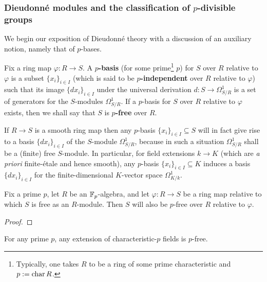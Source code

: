         \subsubsection{Dieudonn\'e modules and the classification of \texorpdfstring{$p$}{}-divisible groups}
            We begin our exposition of Dieudonn\'e theory with a discussion of an auxiliary notion, namely that of $p$-bases.
            \begin{definition}[$p$-bases] \label{def: p_bases}
                Fix a ring map $\varphi: R \to S$. A \textbf{$p$-basis} (for some prime\footnote{Typically, one takes $R$ to be a ring of some prime characteristic and $p := \operatorname{char} R$.} $p$) for $S$ over $R$ relative to $\varphi$ is a subset $\{x_i\}_{i \in I}$ (which is said to be \textbf{$p$-independent} over $R$ relative to $\varphi$) such that its image $\{dx_i\}_{i \in I}$ under the universal derivation $d: S \to \Omega^1_{S/R}$ is a set of generators for the $S$-modules $\Omega^1_{S/R}$. If a $p$-basis for $S$ over $R$ relative to $\varphi$ exists, then we shall say that $S$ is \textbf{$p$-free} over $R$.
            \end{definition}
            \begin{remark}
                If $R \to S$ is a smooth ring map then any $p$-basis $\{x_i\}_{i \in I} \subseteq S$ will in fact give rise to a basis $\{dx_i\}_{i \in I}$ of the $S$-module $\Omega^1_{S/R}$, because in such a situation $\Omega^1_{S/R}$ shall be a (finite) free $S$-module. In particular, for field extensions $k \to K$ (which are \textit{a priori} finite-\'etale and hence smooth), any $p$-basis $\{x_i\}_{i \in I} \subseteq K$ induces a basis $\{dx_i\}_{i \in I}$ for the finite-dimensional $K$-vector space $\Omega^1_{K/k}$. 
            \end{remark}
            \begin{proposition} \label{prop: existence_of_p_bases}
                Fix a prime $p$, let $R$ be an $\mathbb{F}_p$-algebra, and let $\varphi: R \to S$ be a ring map relative to which $S$ is free as an $R$-module. Then $S$ will also be $p$-free over $R$ relative to $\varphi$.
            \end{proposition}
                \begin{proof}
                    
                \end{proof}
            \begin{corollary}
                For any prime $p$, any extension of characteristic-$p$ fields is $p$-free.
            \end{corollary}
